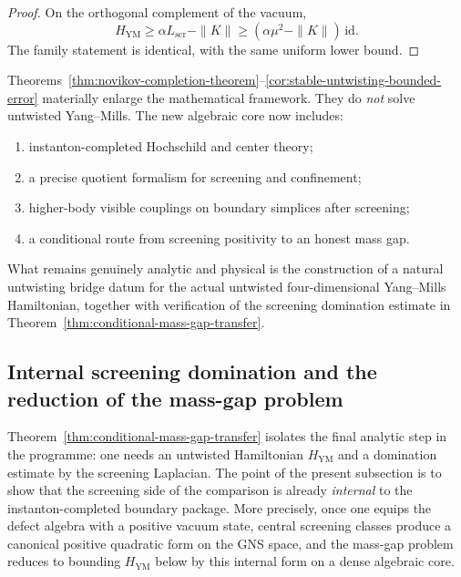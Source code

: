 \begin{proof}
On the orthogonal complement of the vacuum,
\[
H_{\mathrm{YM}}\ge \alpha L_{\mathrm{scr}}-\|K\| \ge (\alpha\mu^2-\|K\|)\,\mathrm{id}.
\]
The family statement is identical, with the same uniform lower bound.
\end{proof}

\begin{remark}
\label{rem:what-is-proved-what-remains-inst}
Theorems~\ref{thm:novikov-completion-theorem}--\ref{cor:stable-untwisting-bounded-error} materially enlarge the
mathematical framework.
They do \emph{not} solve untwisted Yang--Mills.  The new algebraic core now includes:
\begin{enumerate}[label=(\roman*)]
\item instanton-completed Hochschild and center theory;
\item a precise quotient formalism for screening and confinement;
\item higher-body visible couplings on boundary simplices after screening;
\item a conditional route from screening positivity to an honest mass gap.
\end{enumerate}
What remains genuinely analytic and physical is the construction of a natural untwisting bridge datum
for the actual untwisted four-dimensional Yang--Mills Hamiltonian, together with verification of the
screening domination estimate in Theorem~\ref{thm:conditional-mass-gap-transfer}.
\end{remark}

\subsection{Internal screening domination and the reduction of the mass-gap problem}
\label{subsec:internal-screening-domination-reduction}

\begin{summary}
Theorem~\ref{thm:conditional-mass-gap-transfer} isolates the final analytic step in the programme:
one needs an untwisted Hamiltonian $H_{\mathrm{YM}}$ and a domination estimate by the screening Laplacian.
The point of the present subsection is to show that the screening side of the comparison is already
\emph{internal} to the instanton-completed boundary package.
More precisely, once one equips the defect algebra with a positive vacuum state,
central screening classes produce a canonical positive quadratic form on the GNS space,
and the mass-gap problem reduces to bounding $H_{\mathrm{YM}}$ below by this internal form on a dense
algebraic core.
\end{summary}

